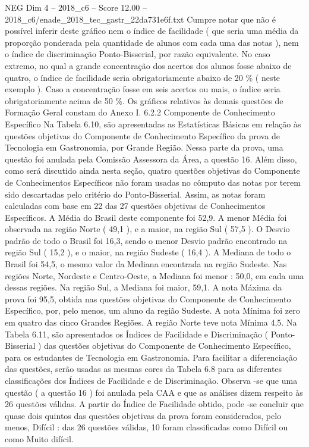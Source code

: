 \begin{textsample}{NEG Dim 4 – 2018\_c6 – Score 12.00 – 2018\_c6/enade\_2018\_tec\_gastr\_22da731e6f.txt}
Cumpre notar que não é possível inferir deste gráfico nem o índice de facilidade ( que seria uma média da proporção ponderada pela quantidade de alunos com cada uma das notas ), nem o índice de discriminação Ponto-Bisserial, por razão equivalente.
No caso extremo, no qual a grande concentração dos acertos dos alunos fosse abaixo de quatro, o índice de facilidade seria obrigatoriamente abaixo de 20 \% ( neste exemplo ).
Caso a concentração fosse em seis acertos ou mais, o índice seria obrigatoriamente acima de 50 \%.
Os gráficos relativos às demais questões de Formação Geral constam do Anexo I. 6.2.2 Componente de Conhecimento Específico Na Tabela 6.10, são apresentadas as Estatísticas Básicas em relação às questões objetivas do Componente de Conhecimento Específico da prova de Tecnologia em Gastronomia, por Grande Região.
Nessa parte da prova, uma questão foi anulada pela Comissão Assessora da Área, a questão 16.
Além disso, como será discutido ainda nesta seção, quatro questões objetivas do Componente de Conhecimentos Específicos não foram usadas no cômputo das notas por terem sido descartadas pelo critério do Ponto-Bisserial.
Assim, as notas foram calculadas com base em 22 das 27 questões objetivas de Conhecimentos Específicos.
A Média do Brasil deste componente foi 52,9.
A menor Média foi observada na região Norte ( 49,1 ), e a maior, na região Sul ( 57,5 ).
O Desvio padrão de todo o Brasil foi 16,3, sendo o menor Desvio padrão encontrado na região Sul ( 15,2 ), e o maior, na região Sudeste ( 16,4 ).
A Mediana de todo o Brasil foi 54,5, o mesmo valor da Mediana encontrada na região Sudeste.
Nas regiões Norte, Nordeste e Centro-Oeste, a Mediana foi menor : 50,0, em cada uma dessas regiões.
Na região Sul, a Mediana foi maior, 59,1.
A nota Máxima da prova foi 95,5, obtida nas questões objetivas do Componente de Conhecimento Específico, por, pelo menos, um aluno da região Sudeste.
A nota Mínima foi zero em quatro das cinco Grandes Regiões.
A região Norte teve nota Mínima 4,5.
Na Tabela 6.11, são apresentados os Índices de Facilidade e Discriminação ( Ponto-Bisserial ) das questões objetivas do Componente de Conhecimento Específico, para os estudantes de Tecnologia em Gastronomia.
Para facilitar a diferenciação das questões, serão usadas as mesmas cores da Tabela 6.8 para as diferentes classificações dos Índices de Facilidade e de Discriminação.
Observa -se que uma questão ( a questão 16 ) foi anulada pela CAA e que as análises dizem respeito às 26 questões válidas.
A partir do Índice de Facilidade obtido, pode -se concluir que quase dois quintos das questões objetivas da prova foram considerados, pelo menos, Difícil : das 26 questões válidas, 10 foram classificadas como Difícil ou como Muito difícil.

\end{textsample}
